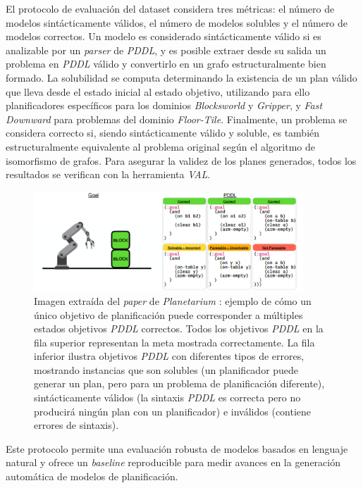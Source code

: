 El protocolo de evaluación del dataset considera tres métricas: el número de modelos sintácticamente válidos, el número de modelos solubles y el número de modelos correctos. Un modelo es considerado sintácticamente válido si es analizable por un \textit{parser} de \textit{PDDL}, y es posible extraer desde su salida un problema en \textit{PDDL} válido y convertirlo en un grafo estructuralmente bien formado. La solubilidad se computa determinando la existencia de un plan válido que lleva desde el estado inicial al estado objetivo, utilizando para ello planificadores específicos para los dominios \textit{Blocksworld} y \textit{Gripper}, y \textit{Fast Downward} para problemas del dominio \textit{Floor-Tile}. Finalmente, un problema se considera correcto si, siendo sintácticamente válido y soluble, es también estructuralmente equivalente al problema original según el algoritmo de isomorfismo de grafos. Para asegurar la validez de los planes generados, todos los resultados se verifican con la herramienta \textit{VAL}.

\begin{figure}[H]
\centering
\includegraphics[width=0.9\textwidth]{Graphics/planetarium.png}
\caption{Imagen extraída del \textit{paper} de \textit{Planetarium} \parencite{zuo2024planetarium}: ejemplo de cómo un único objetivo de planificación puede corresponder a múltiples estados objetivos \textit{PDDL} correctos. Todos los objetivos \textit{PDDL} en la fila superior representan la meta mostrada correctamente. La fila inferior ilustra objetivos \textit{PDDL} con diferentes tipos de errores, mostrando instancias que son solubles (un planificador puede generar un plan, pero para un problema de planificación diferente), sintácticamente válidos (la sintaxis \textit{PDDL} es correcta pero no producirá ningún plan con un planificador) e inválidos (contiene errores de sintaxis).}
\label{fig:planetarium}
\end{figure}

Este protocolo permite una evaluación robusta de modelos basados en lenguaje natural y ofrece un \textit{baseline} reproducible para medir avances en la generación automática de modelos de planificación.

